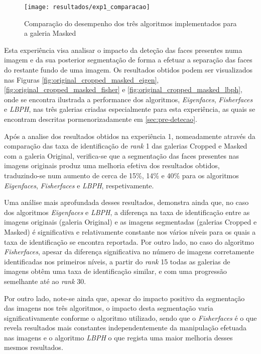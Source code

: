 \begin{figure}[ht]
  \begin{center}
    \texttt{[image: resultados/exp1\_comparacao]}
    \caption{Comparação do desempenho dos três algoritmos implementados para a galeria Masked}
    \label{fig:exp1_comaparacao}
  \end{center}
\end{figure}

Esta experiência visa analisar o impacto da deteção das faces presentes numa imagem e da sua posterior segmentação de forma a efetuar a separação das faces do restante fundo de uma imagem. Os resultados obtidos podem ser visualizados nas Figuras \ref{fig:original_cropped_masked_eigen}, \ref{fig:original_cropped_masked_fisher} e \ref{fig:original_cropped_masked_lbph}, onde se encontra ilustrada a performance dos algoritmos, \textit{Eigenfaces}, \textit{Fisherfaces} e \textit{LBPH}, nas três galerias criadas especialmente para esta experiência, as quais se encontram descritas pormenorizadamente em \ref{sec:pre-detecao}.

Após a analise dos resultados obtidos na experiência 1, nomeadamente através da comparação das taxa de identificação de \textit{rank} 1 das galerias Cropped e Masked com a galeria Original, verifica-se que a segmentação das faces presentes nas imagens originais produz uma melhoria efetiva dos resultados obtidos, traduzindo-se num aumento de cerca de 15\%, 14\% e 40\% para os algoritmos \textit{Eigenfaces}, \textit{Fisherfaces} e \textit{LBPH}, respetivamente.

Uma análise mais aprofundada desses resultados, demonstra ainda que, no caso dos algoritmos \textit{Eigenfaces} e \textit{LBPH}, a diferença na taxa de identificação entre as imagens originais (galeria Original) e as imagens segmentadas (galerias Cropped e Masked) é significativa e relativamente constante nos vários níveis para os quais a taxa de identificação se encontra reportada. Por outro lado, no caso do algoritmo \textit{Fisherfaces}, apesar da diferença significativa no número de imagens corretamente identificadas nos primeiros níveis, a partir do \textit{rank} 15 todas as galerias de imagens obtêm uma taxa de identificação similar, e com uma progressão semelhante até ao \textit{rank} 30.

Por outro lado, note-se ainda que, apesar do impacto positivo da segmentação das imagens nos três algoritmos, o impacto desta segmentação varia significativamente conforme o algoritmo utilizado, sendo que o \textit{Fisherfaces} é o que revela resultados mais constantes independentemente da manipulação efetuada nas imagens e o algoritmo \textit{LBPH} o que regista uma maior melhoria desses mesmos resultados.

